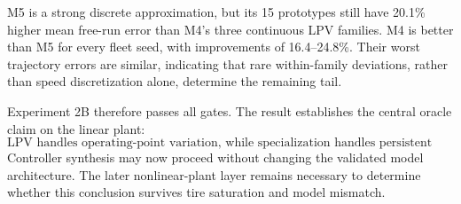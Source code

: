 M5 is a strong discrete approximation, but its 15 prototypes still have 20.1\%
higher mean free-run error than M4's three continuous LPV families.  M4 is better
than M5 for every fleet seed, with improvements of 16.4--24.8\%.  Their worst
trajectory errors are similar, indicating that rare within-family deviations,
rather than speed discretization alone, determine the remaining tail.

Experiment 2B therefore passes all gates.  The result establishes the central
oracle claim on the linear plant:
\begin{equation}
 \boxed{\text{LPV handles operating-point variation, while specialization
 handles persistent fleet variation.}}
\end{equation}
Controller synthesis may now proceed without changing the validated model
architecture.  The later nonlinear-plant layer remains necessary to determine
whether this conclusion survives tire saturation and model mismatch.
